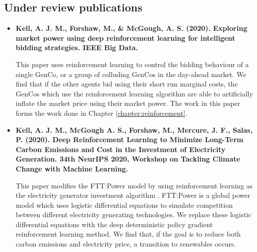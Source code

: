 \subsection*{Under review publications}

\begin{itemize}
	
	\item[\textbf{\cite{Kell2020d}}] \textbf{Kell, A. J. M., Forshaw, M., \& McGough, A. S. (2020). Exploring market power using deep reinforcement learning for intelligent bidding strategies. IEEE Big Data.}

	This paper uses reinforcement learning to control the bidding behaviour of a single GenCo, or a group of colluding GenCos in the day-ahead market. We find that if the other agents bid using their short run marginal costs, the GenCos which use the reinforcement learning algorithm are able to artificially inflate the market price using their market power. The work in this paper forms the work done in Chapter \ref{chapter:reinforcement}.

	\item[\textbf{\cite{KellA.J.M.McGoughA.S.ForshawM.MercureJ.F.Salas2020}}] \textbf{Kell, A. J. M., McGough A. S., Forshaw, M., Mercure, J. F., Salas, P. (2020). Deep Reinforcement Learning to Minimize Long-Term Carbon Emissions and Cost in the Investment of Electricity Generation. 34th NeurIPS 2020, Workshop on Tackling Climate Change with Machine Learning.}
	
	This paper modifies the FTT:Power model by using reinforcement learning as the electricity generator investment algorithm \cite{Mercure2012}. FTT:Power is a global power model which uses logistic differential equations to simulate competition between different electricity generating technologies. We replace these logistic differential equations with the deep deterministic policy gradient reinforcement learning method. We find that, if the goal is to reduce both carbon emissions and electricity price, a transition to renewables occurs.

\end{itemize}


